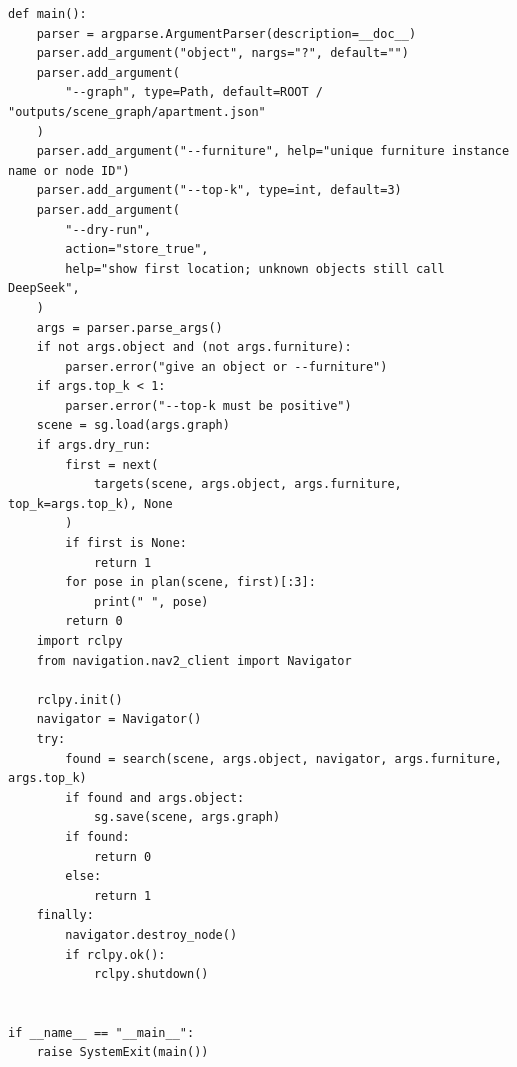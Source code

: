 \documentclass[11pt,a4paper]{book}
\begin{document}
\begin{lstlisting}
def main():
    parser = argparse.ArgumentParser(description=__doc__)
    parser.add_argument("object", nargs="?", default="")
    parser.add_argument(
        "--graph", type=Path, default=ROOT / "outputs/scene_graph/apartment.json"
    )
    parser.add_argument("--furniture", help="unique furniture instance name or node ID")
    parser.add_argument("--top-k", type=int, default=3)
    parser.add_argument(
        "--dry-run",
        action="store_true",
        help="show first location; unknown objects still call DeepSeek",
    )
    args = parser.parse_args()
    if not args.object and (not args.furniture):
        parser.error("give an object or --furniture")
    if args.top_k < 1:
        parser.error("--top-k must be positive")
    scene = sg.load(args.graph)
    if args.dry_run:
        first = next(
            targets(scene, args.object, args.furniture, top_k=args.top_k), None
        )
        if first is None:
            return 1
        for pose in plan(scene, first)[:3]:
            print(" ", pose)
        return 0
    import rclpy
    from navigation.nav2_client import Navigator

    rclpy.init()
    navigator = Navigator()
    try:
        found = search(scene, args.object, navigator, args.furniture, args.top_k)
        if found and args.object:
            sg.save(scene, args.graph)
        if found:
            return 0
        else:
            return 1
    finally:
        navigator.destroy_node()
        if rclpy.ok():
            rclpy.shutdown()


if __name__ == "__main__":
    raise SystemExit(main())
\end{lstlisting}
\end{document}
